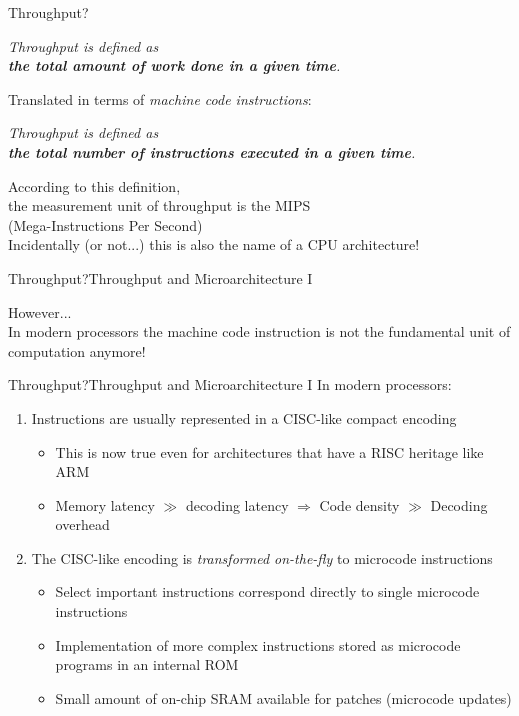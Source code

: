 \begin{frame}{Throughput?}
\begin{center}
\emph{
Throughput is defined as\\\textbf{the total amount of work done in a given time}.\cite{hennessy2011computer}\\
}

\bigskip
Translated in terms of \emph{machine code instructions}:\\
\bigskip

\emph{
Throughput is defined as\\\textbf{the total number of instructions executed in a given time}.\\
}

\bigskip
According to this definition,\\the measurement unit of throughput is the \alert{MIPS}\\(Mega-Instructions Per Second)\\
\medskip
\footnotesize{Incidentally (or not...) this is also the name of a CPU architecture!}
\end{center}
\end{frame}


\begin{frame}{Throughput?}{Throughput and Microarchitecture I}
\begin{center}
{\LARGE However...}\\\Large
\bigskip
In modern processors the machine code instruction is not the fundamental unit of computation anymore!
\end{center}
\end{frame}


\begin{frame}{Throughput?}{Throughput and Microarchitecture I}
In modern processors:
\begin{enumerate}
\item Instructions are usually represented in a \alert{CISC-like} compact encoding
	\begin{itemize}
	\item This is now true even for architectures that have a RISC heritage like ARM
	\item Memory latency $\gg$ decoding latency $\Rightarrow$ Code density $\gg$ Decoding overhead
	\end{itemize}
\item The CISC-like encoding is \emph{transformed on-the-fly} to \alert{microcode instructions}
	\begin{itemize}
	\item Select important instructions correspond directly to single microcode instructions
	\item Implementation of more complex instructions stored as \alert{microcode programs} in an internal ROM
	\item Small amount of on-chip SRAM available for patches (microcode updates)
	\end{itemize}
\end{enumerate}
\end{frame}


